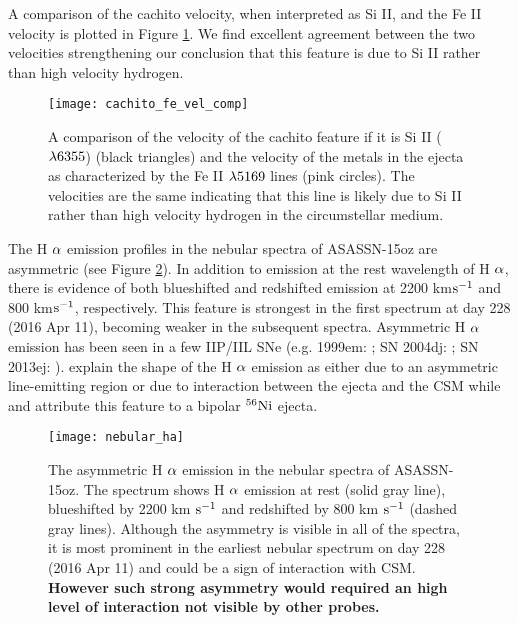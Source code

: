 \documentclass[a4paper,fleqn,usenatbib]{mnras}
\begin{document}
A comparison of the cachito velocity, when interpreted as Si II, and the Fe II velocity is plotted in Figure \ref{fig:SiVelocity}.
We find excellent agreement between the two velocities strengthening our conclusion that this feature is due to Si II rather than high velocity hydrogen.
\begin{figure}
\begin{center}
\texttt{[image: cachito\_fe\_vel\_comp]}
\caption{A comparison of the velocity of the cachito feature if it is Si II ($\rm{\lambda6355}$) (black triangles) and the velocity of the metals in the ejecta as characterized by the Fe II $\rm{\lambda5169}$ lines (pink circles).
The velocities are the same indicating that this line is likely due to Si II rather than high velocity hydrogen in the circumstellar medium.}
\label{fig:SiVelocity}
\end{center}
\end{figure}

The H $\rm{\alpha}$ emission profiles in the nebular spectra of ASASSN-15oz are asymmetric (see Figure \ref{fig:nebHa}).
In addition to emission at the rest wavelength of H $\rm{\alpha}$, there is evidence of both blueshifted and redshifted emission at 2200 km$\rm{s^{-1}}$ and 800 km$\rm{s^{-1}}$, respectively. 
This feature is strongest in the first spectrum at day 228 (2016 Apr 11), becoming weaker in the subsequent spectra.
Asymmetric H $\rm{\alpha}$ emission has been seen in a few IIP/IIL SNe (e.g. 1999em: \citealt{2001leonard}; SN 2004dj: \citealt{2005chugai}; SN 2013ej: \citealt{2017utrobin}).
\citet{2001leonard} explain the shape of the H $\rm{\alpha}$ emission as either due to an asymmetric line-emitting region or due to interaction between the ejecta and the CSM while \citet{2005chugai} and \citet{2017utrobin} attribute this feature to a bipolar $\rm{^{56}Ni}$ ejecta. 

\begin{figure}
\begin{center}
\texttt{[image: nebular\_ha]} %
\caption{The asymmetric H $\rm{\alpha}$ emission in the nebular spectra of ASASSN-15oz. 
The spectrum shows H $\rm{\alpha}$ emission at rest (solid gray line), blueshifted by 2200 km $\rm{s^{-1}}$ and redshifted by 800 km $\rm{s^{-1}}$ (dashed gray lines).
Although the asymmetry is visible in all of the spectra, it is most prominent in the earliest nebular spectrum on day 228 (2016 Apr 11) and could be a sign of interaction with CSM.
\textbf{However such strong asymmetry would required an high level of interaction not visible by other probes.}
}
\label{fig:nebHa}
\end{center}
\end{figure}
\end{document}
